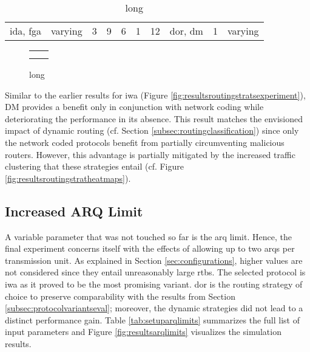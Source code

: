 \begin{table}
    \centering
    \begin{tabulary}{\textwidth}{C|C|C|C|C|C|C|C|C|C}
        \pProtVar{} & \pNCMode{} & \pEncMods{} & \pAuthMods{} & \pRQSize{} & \pARQLimit{} & \pARQTimeout{} & \pRStrat{} & \pAttackerSet{} & \pAttackProb{} \\\hline
        \gls{ida}, \gls{fga} & varying & 3 & 9 & 6 & 1 & 12 & \gls{dor}, \gls{dm} & 1 & varying \\
    \end{tabulary}
    \caption[Input parameters for comparing DOR and DM]{long}
    \label{tab:setuproutingdorvsdm}
\end{table}

\begin{figure}
    \begin{tabular}{cc}
         &  \\
         & 
    \end{tabular}
    \caption[Results for the DOR and DM comparison]{long}
    \label{fig:resultsroutingdorvsdm}
\end{figure}

Similar to the earlier results for \gls{iwa} (Figure \ref{fig:resultsroutingstratsexperiment}), DM provides a benefit only in conjunction with network
coding while deteriorating the performance in its absence. This result matches the envisioned impact of dynamic routing (cf. Section
\ref{subsec:routingclassification}) since only the network coded protocols benefit from partially circumventing malicious routers. However, this
advantage is partially mitigated by the increased traffic clustering that these strategies entail (cf. Figure \ref{fig:resultsroutingstratheatmaps}).

\subsection{Increased ARQ Limit}
A variable parameter that was not touched so far is the \gls{arq} limit. Hence, the final experiment concerns itself with the effects of allowing up
to two \glspl{arq} per transmission unit. As explained in Section \ref{sec:configurations}, higher values are not considered since they entail
unreasonably large \glspl{rtb}. The selected protocol is \gls{iwa} as it proved to be the most promising variant. \Gls{dor} is the routing strategy of
choice to preserve comparability with the results from Section \ref{subsec:protocolvariantseval}; moreover, the dynamic strategies did not lead to a
distinct performance gain. Table \vref{tab:setuparqlimits} summarizes the full list of input parameters and Figure \vref{fig:resultsarqlimits}
visualizes the simulation results.

